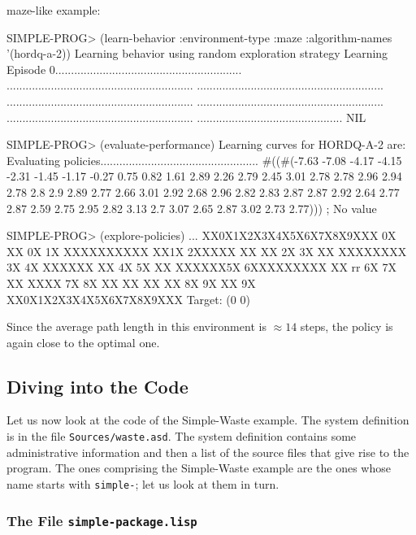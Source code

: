 \documentclass[a4paper]{amsart}
\begin{document}
maze-like example:
\begin{Code}
  SIMPLE-PROG> (learn-behavior :environment-type :maze
                               :algorithm-names '(hordq-a-2))
  Learning behavior using random exploration strategy
  Learning
  Episode
  0...........................................................
   ...........................................................
   ...........................................................
   ...........................................................
   ...........................................................
   ...........................................................
   ..............................................
  NIL

  SIMPLE-PROG> (evaluate-performance)  
  Learning curves for HORDQ-A-2 are:
  Evaluating policies..................................................
  #((#(-7.63 -7.08 -4.17 -4.15 -2.31 -1.45
       -1.17 -0.27 0.75 0.82 1.61 2.89
       2.26 2.79 2.45 3.01 2.78 2.78 2.96
       2.94 2.78 2.8 2.9 2.89 2.77 2.66
       3.01 2.92 2.68 2.96 2.82 2.83 2.87
       2.87 2.92 2.64 2.77 2.87 2.59 2.75
       2.95 2.82 3.13 2.7 3.07 2.65 2.87 3.02 2.73 2.77)))
  ; No value

  SIMPLE-PROG> (explore-policies)
  \lsq...\rsq
  XX0X1X2X3X4X5X6X7X8X9XXX
  0X      XX            0X
  1X      XXXXXXXXXX  XX1X
  2XXXXX  XX  XX        2X
  3X      XX  XXXXXXXX  3X
  4X  XXXXXX  XX        4X
  5X          XX  XXXXXX5X
  6XXXXXXXXX  XX    rr  6X
  7X  XX      XXXX      7X
  8X  XX  XX  XX  XX    8X
  9X      XX            9X
  XX0X1X2X3X4X5X6X7X8X9XXX
  Target: (0 0)
\end{Code}
Since the average path length in this environment is $\approx 14$
steps, the policy is again close to the optimal one.

\subsection{Diving into the Code}
\label{sec:diving-into-code}

Let us now look at the code of the Simple-Waste example.  The system
definition is in the file \texttt{Sources/waste.asd}.  The system
definition contains some administrative information and then a list of
the source files that give rise to the program.  The ones comprising
the Simple-Waste example are the ones whose name starts with
\texttt{simple-}; let us look at them in turn.

\subsubsection{The File \texttt{simple-package.lisp}}
\label{sec:file-simple-package.lisp} 
\end{document}
